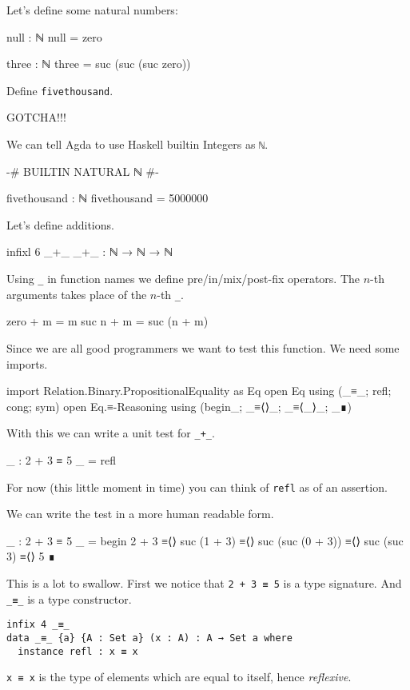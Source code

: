 Let's define some natural numbers:
\begin{code}
null : ℕ
null = zero

three : ℕ
three = suc (suc (suc zero))
\end{code}

\begin{exercise}
  Define \verb+fivethousand+.
\end{exercise}

GOTCHA!!!

We can tell Agda to use Haskell builtin Integers as \verb+ℕ+.

\begin{code}
{-# BUILTIN NATURAL ℕ #-}

fivethousand : ℕ
fivethousand = 5000000
\end{code}

Let's define additions.
\begin{code}
infixl 6 _+_
_+_ : ℕ → ℕ → ℕ
\end{code}

Using \verb+_+ in function names we define pre/in/mix/post-fix operators. The
$n$-th arguments takes place of the $n$-th \verb+_+.
\begin{code}
zero + m = m
suc n + m = suc (n + m)
\end{code}

Since we are all good programmers we want to test this function.
We need some imports.
\begin{code}
import Relation.Binary.PropositionalEquality as Eq
open Eq using (_≡_; refl; cong; sym)
open Eq.≡-Reasoning using (begin_; _≡⟨⟩_; _≡⟨_⟩_; _∎)
\end{code}

With this we can write a unit test for \verb=_+_=.
\begin{code}
_ : 2 + 3 ≡ 5
_ = refl
\end{code}
For now (this little moment in time) you can think of \verb+refl+ as
of an assertion.

We can write the test in a more human readable form.
\begin{code}
_ : 2 + 3 ≡ 5
_ =
  begin
    2 + 3
  ≡⟨⟩
    suc (1 + 3)
  ≡⟨⟩
    suc (suc (0 + 3))
  ≡⟨⟩
    suc (suc 3)
  ≡⟨⟩
    5
  ∎
\end{code}

This is a lot to swallow. First we notice that \verb=2 + 3 ≡ 5= is a type signature.
And \verb+_≡_+ is a type constructor.
\begin{verbatim}
infix 4 _≡_
data _≡_ {a} {A : Set a} (x : A) : A → Set a where
  instance refl : x ≡ x
\end{verbatim}
\verb+x ≡ x+ is the type of elements which are equal to itself, hence \emph{reflexive}.

